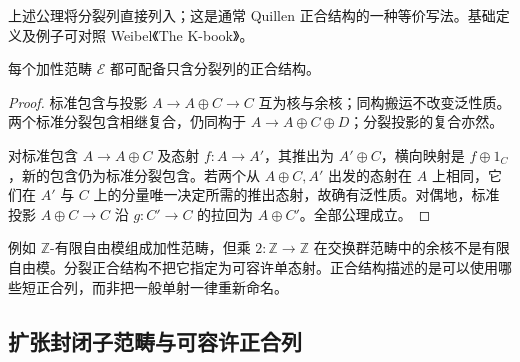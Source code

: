 \ProseParagraphBreak
上述公理将分裂列直接列入；这是通常 Quillen 正合结构的一种等价写法。基础定义及例子可对照 Weibel《The K-book》\cite[Chapter II, Definition 7.0 and Examples 7.1.1--7.1.2]{Weibel2013KBook}。

\begin{proposition}\label{b4:prop:B-split-exact}
	每个加性范畴 \(\mathcal E\) 都可配备只含分裂列的正合结构。
\end{proposition}
\begin{proof}
	标准包含与投影 \(A\rightarrow A\oplus C\rightarrow C\) 互为核与余核；同构搬运不改变泛性质。两个标准分裂包含相继复合，仍同构于 \(A\rightarrow A\oplus C\oplus D\)；分裂投影的复合亦然。

	对标准包含 \(A\rightarrow A\oplus C\) 及态射 \(f:A\rightarrow A'\)，其推出为 \(A'\oplus C\)，横向映射是 \(f\oplus1_C\)，新的包含仍为标准分裂包含。若两个从 \(A\oplus C,A'\) 出发的态射在 \(A\) 上相同，它们在 \(A'\) 与 \(C\) 上的分量唯一决定所需的推出态射，故确有泛性质。对偶地，标准投影 \(A\oplus C\rightarrow C\) 沿 \(g:C'\rightarrow C\) 的拉回为 \(A\oplus C'\)。全部公理成立。
\end{proof}

例如 \(\mathbb Z\)-有限自由模组成加性范畴，但乘 \(2:\mathbb Z\rightarrow\mathbb Z\) 在交换群范畴中的余核不是有限自由模。分裂正合结构不把它指定为可容许单态射。正合结构描述的是可以使用哪些短正合列，而非把一般单射一律重新命名。

\subsection{扩张封闭子范畴与可容许正合列}
\label{b4:subsec:B01:02}

